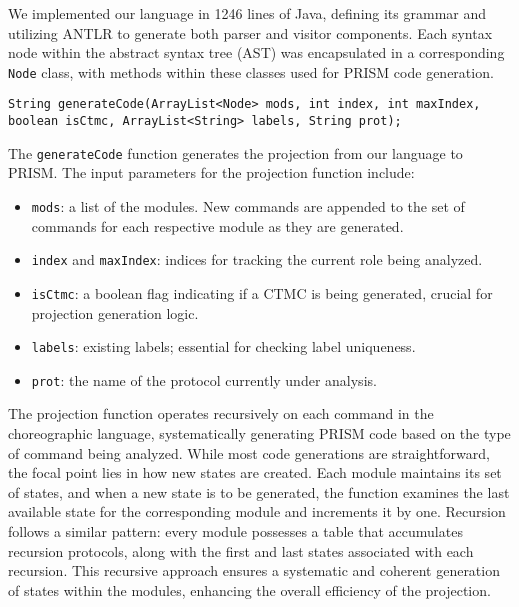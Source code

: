 We implemented our language in 1246 lines of Java, defining its grammar and utilizing ANTLR \cite{ANTLR} to generate both parser and visitor components. Each syntax node within the abstract syntax tree (AST) was encapsulated in a corresponding {\tt Node} class, with methods within these classes used for PRISM code generation.
\begin{lstlisting}[language=Eclipse,caption=The \texttt{generateCode} function.,label=genfun1,numbers=none]
	String generateCode(ArrayList<Node> mods, int index, int maxIndex, boolean isCtmc, ArrayList<String> labels, String prot);	
\end{lstlisting}
The {\tt generateCode} function generates the projection from our language to PRISM.
The input parameters for the projection function include:
\begin{itemize}
\item \texttt{mods}: a list of the modules.  New commands are appended to the set of commands for each respective module as they are generated.
\item \texttt{index} and \texttt{maxIndex}: indices for tracking the current role being analyzed.
\item \texttt{isCtmc}: a boolean flag indicating if a CTMC is being generated, crucial for projection generation logic.
\item \texttt{labels}: existing labels; essential for checking label uniqueness.
\item \texttt{prot}: the name of the protocol currently under analysis.
\end{itemize}
The projection function operates recursively on each command in the choreographic language, systematically generating PRISM code based on the type of command being analyzed. While most code generations are straightforward, the focal point lies in how new states are created. Each module maintains its set of states, and when a new state is to be generated, the function examines the last available state for the corresponding module and increments it by one.
Recursion follows a similar pattern: every module possesses a table that accumulates recursion protocols, along with the first and last states associated with each recursion. This recursive approach ensures a systematic and coherent generation of states within the modules, enhancing the overall efficiency of the projection.

